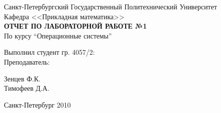 \begin{titlepage}

\begin{center}

\large Санкт-Петербургский Государственный Политехнический Университет \\
Кафедра <<Прикладная математика>> \\ [8.0cm]
\textbf{\textsc{ОТЧЕТ ПО ЛАБОРАТОРНОЙ РАБОТЕ №1}}\\[1.0cm]
По курсу ``Операционные системы''\\[3.0cm]

\begin{minipage}{0.4\textwidth}
\begin{flushleft} \large
  Выполнил студент гр. 4057/2: \\ [1.0cm]
  Преподаватель:
\end{flushleft}
\end{minipage}
\begin{minipage}{0.4\textwidth}
\begin{flushright} \large
Зенцев Ф.К. \\ [1.0cm]
Тимофеев Д.А.
\end{flushright}
\end{minipage}

\vfill

\large Санкт-Петербург 2010



\end{center}
\end{titlepage}
